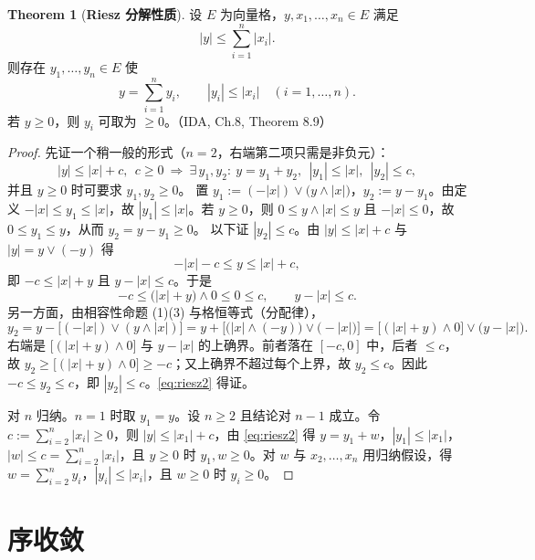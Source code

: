 \documentclass[oneside]{book}
\theoremstyle{definition}
\theoremstyle{definition}
\newtheorem{theorem}{Theorem}[section]
\begin{document}
	\begin{theorem}[\bfseries{Riesz 分解性质}]
		设 $E$ 为向量格，$y,x_{1},\dots,x_{n}\in E$ 满足
		\[
		|y|\leqslant\sum_{i=1}^{n}|x_{i}| .
		\]
		则存在 $y_{1},\dots,y_{n}\in E$ 使
		\[
		y=\sum_{i=1}^{n}y_{i},\qquad |y_{i}|\leqslant|x_{i}|\quad(i=1,\dots,n).
		\]
		若 $y\geqslant0$，则 $y_{i}$ 可取为 $\geqslant0$。（IDA, Ch.8, Theorem 8.9）
	\end{theorem}
	
	\begin{proof}
		先证一个稍一般的形式（$n=2$，右端第二项只需是非负元）：
		\begin{equation}\label{eq:riesz2}
			|y|\leqslant|x|+c,\ \ c\geqslant0
			\ \Longrightarrow\
			\exists\,y_{1},y_{2}:\ y=y_{1}+y_{2},\ \ |y_{1}|\leqslant|x|,\ \ |y_{2}|\leqslant c,
		\end{equation}
		并且 $y\geqslant0$ 时可要求 $y_{1},y_{2}\geqslant0$。
		置 $y_{1}:=(-|x|)\vee\big(y\wedge|x|\big)$，$y_{2}:=y-y_{1}$。由定义 $-|x|\leqslant y_{1}\leqslant|x|$，故 $|y_{1}|\leqslant|x|$。若 $y\geqslant0$，则 $0\leqslant y\wedge|x|\leqslant y$ 且 $-|x|\leqslant0$，故 $0\leqslant y_{1}\leqslant y$，从而 $y_{2}=y-y_{1}\geqslant0$。
		以下证 $|y_{2}|\leqslant c$。由 $|y|\leqslant|x|+c$ 与 $|y|=y\vee(-y)$ 得
		\[
		-|x|-c\leqslant y\leqslant|x|+c,
		\]
		即 $-c\leqslant|x|+y$ 且 $y-|x|\leqslant c$。于是
		\[
		-c\leqslant\big(|x|+y\big)\wedge0\leqslant0\leqslant c,\qquad y-|x|\leqslant c .
		\]
		另一方面，由相容性命题 (1)(3) 与格恒等式（分配律），
		\[
		y_{2}=y-\big[(-|x|)\vee(y\wedge|x|)\big]
		=y+\Big[\big(|x|\wedge(-y)\big)\vee\big(-|x|\big)\Big]
		=\big[(|x|+y)\wedge0\big]\vee\big(y-|x|\big).
		\]
		右端是 $\big[(|x|+y)\wedge0\big]$ 与 $y-|x|$ 的上确界。前者落在 $[-c,0]$ 中，后者 $\leqslant c$，故 $y_{2}\geqslant\big[(|x|+y)\wedge0\big]\geqslant-c$；又上确界不超过每个上界，故 $y_{2}\leqslant c$。因此 $-c\leqslant y_{2}\leqslant c$，即 $|y_{2}|\leqslant c$。\eqref{eq:riesz2} 得证。
		
		对 $n$ 归纳。$n=1$ 时取 $y_{1}=y$。设 $n\geqslant2$ 且结论对 $n-1$ 成立。令 $c:=\sum_{i=2}^{n}|x_{i}|\geqslant0$，则 $|y|\leqslant|x_{1}|+c$，由 \eqref{eq:riesz2} 得 $y=y_{1}+w$，$|y_{1}|\leqslant|x_{1}|$，$|w|\leqslant c=\sum_{i=2}^{n}|x_{i}|$，且 $y\geqslant0$ 时 $y_{1},w\geqslant0$。对 $w$ 与 $x_{2},\dots,x_{n}$ 用归纳假设，得 $w=\sum_{i=2}^{n}y_{i}$，$|y_{i}|\leqslant|x_{i}|$，且 $w\geqslant0$ 时 $y_{i}\geqslant0$。
	\end{proof}
	
	\section{序收敛}
	
\end{document}
